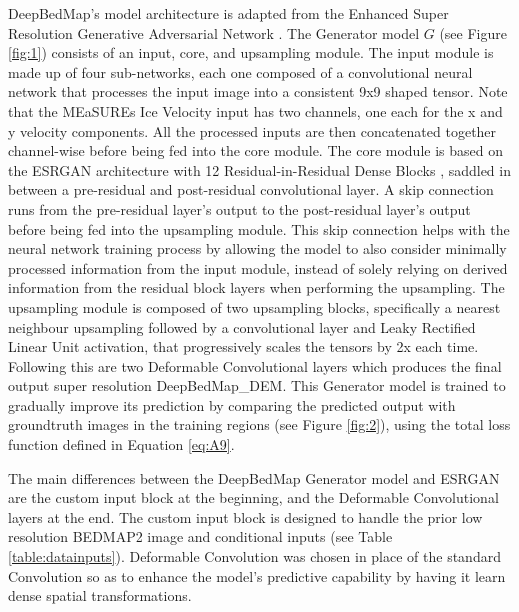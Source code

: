 \documentclass[tc, manuscript]{copernicus}
\begin{document}
DeepBedMap's model architecture is adapted from the Enhanced Super Resolution Generative Adversarial Network \citep[ESRGAN,][]{WangESRGANEnhancedSuperResolution2019}.
The Generator model $G$ (see Figure \ref{fig:1}) consists of an input, core, and upsampling module.
The input module is made up of four sub-networks, each one composed of a convolutional neural network that processes the input image into a consistent 9x9 shaped tensor.
Note that the MEaSUREs Ice Velocity \citep{MouginotMEaSUREsPhaseMap2019} input has two channels, one each for the x and y velocity components.
All the processed inputs are then concatenated together channel-wise before being fed into the core module.
The core module is based on the ESRGAN architecture with 12 Residual-in-Residual Dense Blocks \citep[see][for details]{WangESRGANEnhancedSuperResolution2019}, saddled in between a pre-residual and post-residual convolutional layer.
A skip connection runs from the pre-residual layer's output to the post-residual layer's output before being fed into the upsampling module.
This skip connection \citep{HeIdentityMappingsDeep2016} helps with the neural network training process by allowing the model to also consider minimally processed information from the input module, instead of solely relying on derived information from the residual block layers when performing the upsampling.
The upsampling module is composed of two upsampling blocks, specifically a nearest neighbour upsampling followed by a convolutional layer and Leaky Rectified Linear Unit \citep[LeakyReLU,][]{MaasRectifiernonlinearitiesimprove2013} activation, that progressively scales the tensors by 2x each time.
Following this are two Deformable Convolutional layers \citep{DaiDeformableConvolutionalNetworks2017} which produces the final output super resolution DeepBedMap\_DEM.
This Generator model is trained to gradually improve its prediction by comparing the predicted output with groundtruth images in the training regions (see Figure \ref{fig:2}), using the total loss function defined in Equation \eqref{eq:A9}.

The main differences between the DeepBedMap Generator model and ESRGAN are the custom input block at the beginning, and the Deformable Convolutional layers at the end.
The custom input block is designed to handle the prior low resolution BEDMAP2 image and conditional inputs (see Table \ref{table:datainputs}).
Deformable Convolution was chosen in place of the standard Convolution so as to enhance the model's predictive capability by having it learn dense spatial transformations.
\end{document}
